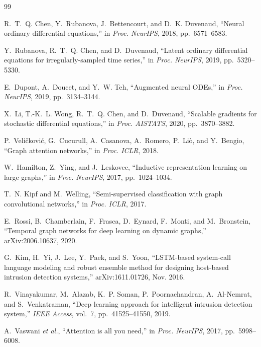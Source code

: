 \documentclass[10pt,journal,compsoc]{IEEEtran}
\begin{document}

\begin{thebibliography}{99}

R.~T.~Q. Chen, Y.~Rubanova, J.~Bettencourt, and D.~K. Duvenaud, ``Neural ordinary differential equations,'' in \emph{Proc. NeurIPS}, 2018, pp.~6571--6583.

Y.~Rubanova, R.~T.~Q. Chen, and D.~Duvenaud, ``Latent ordinary differential equations for irregularly-sampled time series,'' in \emph{Proc. NeurIPS}, 2019, pp.~5320--5330.

E.~Dupont, A.~Doucet, and Y.~W. Teh, ``Augmented neural ODEs,'' in \emph{Proc. NeurIPS}, 2019, pp.~3134--3144.

X.~Li, T.-K.~L. Wong, R.~T.~Q. Chen, and D.~Duvenaud, ``Scalable gradients for stochastic differential equations,'' in \emph{Proc. AISTATS}, 2020, pp.~3870--3882.

P.~Veli\v{c}kovi\'{c}, G.~Cucurull, A.~Casanova, A.~Romero, P.~Li\`{o}, and Y.~Bengio, ``Graph attention networks,'' in \emph{Proc. ICLR}, 2018.

W.~Hamilton, Z.~Ying, and J.~Leskovec, ``Inductive representation learning on large graphs,'' in \emph{Proc. NeurIPS}, 2017, pp.~1024--1034.

T.~N. Kipf and M.~Welling, ``Semi-supervised classification with graph convolutional networks,'' in \emph{Proc. ICLR}, 2017.

E.~Rossi, B.~Chamberlain, F.~Frasca, D.~Eynard, F.~Monti, and M.~Bronstein, ``Temporal graph networks for deep learning on dynamic graphs,'' arXiv:2006.10637, 2020.

G.~Kim, H.~Yi, J.~Lee, Y.~Paek, and S.~Yoon, ``LSTM-based system-call language modeling and robust ensemble method for designing host-based intrusion detection systems,'' arXiv:1611.01726, Nov. 2016.

R.~Vinayakumar, M.~Alazab, K.~P. Soman, P.~Poornachandran, A.~Al-Nemrat, and S.~Venkatraman, ``Deep learning approach for intelligent intrusion detection system,'' \emph{IEEE Access}, vol.~7, pp.~41525--41550, 2019.

A.~Vaswani \emph{et al.}, ``Attention is all you need,'' in \emph{Proc. NeurIPS}, 2017, pp.~5998--6008.


\end{thebibliography}
\end{document}
